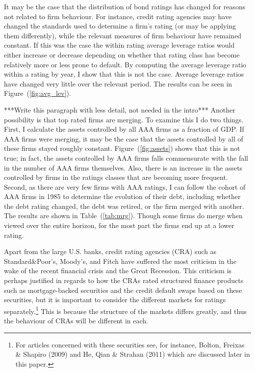 \documentclass[titlepage]{article}
\begin{document}
It may be the case that the distribution of bond ratings has changed for reasons not related to firm behaviour. For instance, credit rating agencies may have changed the standards used to determine a firm's rating (or may be applying them differently), while the relevant measures of firm behaviour have remained constant. If this was the case the within rating average leverage ratios would either increase or decrease depending on whether that rating class has become relatively more or less prone to default. By computing the average leverage ratio within a rating by year, I show that this is not the case. Average leverage ratios have changed very little over the relevant period. The results can be seen in Figure~(\ref{fig:avg_lev}). 

***Write this paragraph with less detail, not needed in the intro***
Another possibility is that top rated firms are merging. To examine this I do two things. First, I calculate the assets controlled by all AAA firms as a fraction of GDP. If AAA firms were merging, it may be the case that the assets controlled by all of these firms stayed roughly constant. Figure~(\ref{fig:assets}) shows that this is not true; in fact, the assets controlled by AAA firms falls commensurate with the fall in the number of AAA firms themselves. Also, there is an increase in the assets controlled by firms in the ratings classes that are becoming more frequent. Second, as there are very few firms with AAA ratings, I can follow the cohort of AAA firms in 1985 to determine the evolution of their debt, including whether the debt rating changed, the debt was retired, or the firm merged with another. The results are shown in Table~(\ref{tab:mrg}). Though some firms do merge when viewed over the entire horizon, for the most part the firms end up at a lower rating.

Apart from the large U.S. banks, credit rating agencies (CRA) such as Standard\&Poor's, Moody's, and Fitch have suffered the most criticism in the wake of the recent financial crisis and the Great Recession. This criticism is perhaps justified in regards to how the CRAs rated structured finance products such as mortgage-backed securities and the credit default swaps based on these securities, but it is important to consider the different markets for ratings separately.\footnote{For articles concerned with these securities see, for instance, Bolton, Freixas \& Shapiro (2009) and He, Qian \& Strahan (2011) which are discussed later in this paper.} This is because the structure of the markets differs greatly, and thus the behaviour of CRAs will be different in each.
\end{document}
